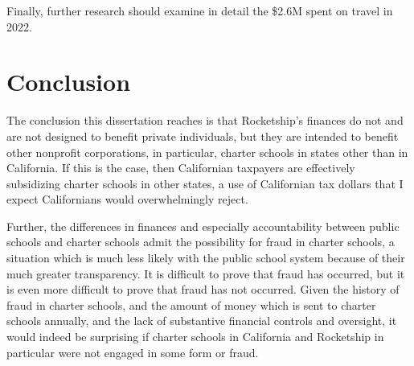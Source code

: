 Finally, further research should examine in detail the \$2.6M spent on travel in 2022. 

\section{Conclusion}%
\label{sec:conclusion}\indent%

The conclusion this dissertation reaches is that Rocketship's finances do not and are not designed to benefit private individuals, but they are intended to benefit other nonprofit corporations, in particular, charter schools in states other than in California. If this is the case, then Californian taxpayers are effectively subsidizing charter schools in other states, a use of Californian tax dollars that I expect Californians would overwhelmingly reject.

Further, the differences in finances and especially accountability between public schools and charter schools admit the possibility for fraud in charter schools, a situation which is much less likely with the public school system because of their much greater transparency. It is difficult to prove that fraud has occurred, but it is even more difficult to prove that fraud has not occurred. Given the history of fraud in charter schools, and the amount of money which is sent to charter schools annually, and the lack of substantive financial controls and oversight, it would indeed be surprising if charter schools in California and Rocketship in particular were not engaged in some form or fraud.

